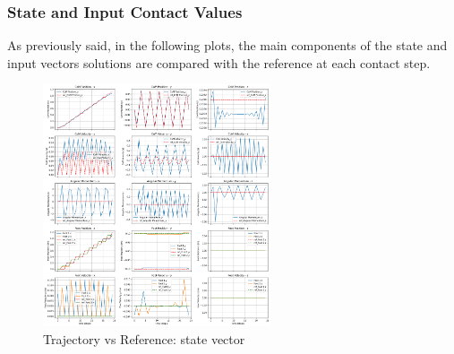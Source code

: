 \documentclass[main.tex]{subfiles}
\begin{document}
\subsubsection*{State and Input Contact Values}
As previously said, in the following plots, the main components of the state and input vectors solutions are compared with the reference at each contact step.
\begin{figure}[htbp]
    \centering
    \includegraphics[width=0.6\textwidth]{figures/contact_x_walking.png}
    \caption{Trajectory vs Reference: state vector}
    \label{fig:contact_x_walking}
\end{figure}
\end{document}
